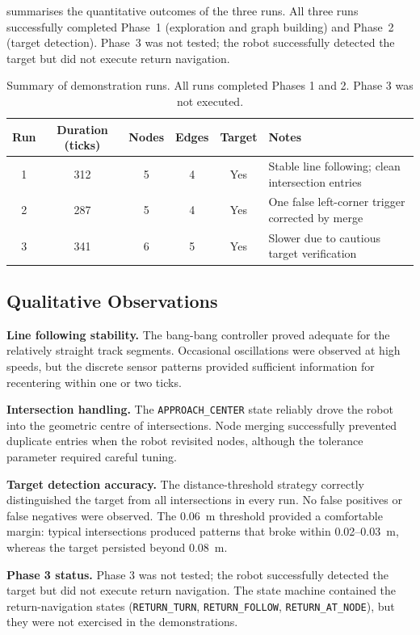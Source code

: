 \documentclass[runningheads]{llncs}
\begin{document}
 summarises the quantitative outcomes of the three runs. All three runs successfully completed Phase~1 (exploration and graph building) and Phase~2 (target detection). Phase~3 was not tested; the robot successfully detected the target but did not execute return navigation.

\begin{table}[t]
\centering
\caption{Summary of demonstration runs. All runs completed Phases 1 and 2. Phase 3 was not executed.}
\label{tab:results}
\begin{tabular}{@{}cccccl@{}}
\toprule
\textbf{Run} & \textbf{Duration (ticks)} & \textbf{Nodes} & \textbf{Edges} & \textbf{Target} & \textbf{Notes} \\
\midrule
1 & 312 & 5 & 4 & Yes & Stable line following; clean intersection entries \\
2 & 287 & 5 & 4 & Yes & One false left-corner trigger corrected by merge \\
3 & 341 & 6 & 5 & Yes & Slower due to cautious target verification \\
\bottomrule
\end{tabular}
\end{table}

\subsection{Qualitative Observations}

\textbf{Line following stability.} The bang-bang controller proved adequate for the relatively straight track segments. Occasional oscillations were observed at high speeds, but the discrete sensor patterns provided sufficient information for recentering within one or two ticks.

\textbf{Intersection handling.} The \texttt{APPROACH\_CENTER} state reliably drove the robot into the geometric centre of intersections. Node merging successfully prevented duplicate entries when the robot revisited nodes, although the tolerance parameter required careful tuning.

\textbf{Target detection accuracy.} The distance-threshold strategy correctly distinguished the target from all intersections in every run. No false positives or false negatives were observed. The 0.06~m threshold provided a comfortable margin: typical intersections produced patterns that broke within 0.02--0.03~m, whereas the target persisted beyond 0.08~m.

\textbf{Phase 3 status.} Phase 3 was not tested; the robot successfully detected the target but did not execute return navigation. The state machine contained the return-navigation states (\texttt{RETURN\_TURN}, \texttt{RETURN\_FOLLOW}, \texttt{RETURN\_AT\_NODE}), but they were not exercised in the demonstrations.
\end{document}
